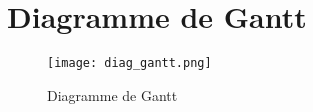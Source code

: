 \documentclass[11pt]{report}
\begin{document}

  



\chapter{Diagramme de Gantt} %


\begin{landscape}



 \pagestyle{empty} 

 \begin{figure}[h!]
  \caption{Diagramme de Gantt}
  \hspace{-4.7cm}
    \texttt{[image: diag\_gantt.png]}
\end{figure}
 

 \end{landscape}

%
\end{document}
